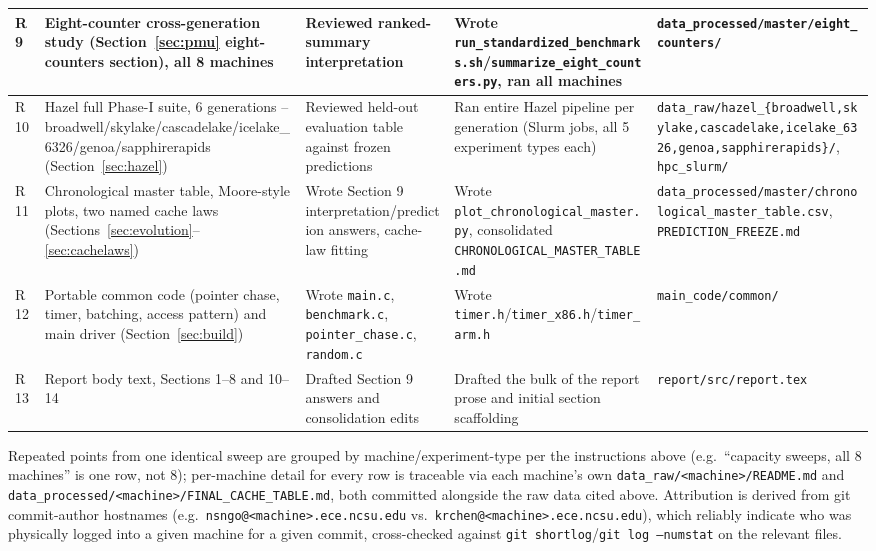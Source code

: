 \documentclass{article}
\begin{document}
\begin{longtable}{|p{1.2cm}|p{4cm}|p{2.5cm}|p{2.5cm}|p{3cm}|}
\hline
R9 & Eight-counter cross-generation study (Section~\ref{sec:pmu} eight-counters section), all 8 machines & Reviewed ranked-summary interpretation & Wrote \texttt{run\_standardized\_benchmarks.sh}/\texttt{summarize\_eight\_counters.py}, ran all machines & \texttt{data\_processed/master/eight\_counters/}\\
\hline
R10 & Hazel full Phase-I suite, 6 generations -- broadwell/skylake/cascadelake/icelake\_6326/genoa/sapphirerapids (Section~\ref{sec:hazel}) & Reviewed held-out evaluation table against frozen predictions & Ran entire Hazel pipeline per generation (Slurm jobs, all 5 experiment types each) & \texttt{data\_raw/hazel\_\{broadwell,skylake,cascadelake,icelake\_6326,genoa,sapphirerapids\}/}, \texttt{hpc\_slurm/}\\
\hline
R11 & Chronological master table, Moore-style plots, two named cache laws (Sections~\ref{sec:evolution}--\ref{sec:cachelaws}) & Wrote Section 9 interpretation/prediction answers, cache-law fitting & Wrote \texttt{plot\_chronological\_master.py}, consolidated \texttt{CHRONOLOGICAL\_MASTER\_TABLE.md} & \texttt{data\_processed/master/chronological\_master\_table.csv}, \texttt{PREDICTION\_FREEZE.md}\\
\hline
R12 & Portable common code (pointer chase, timer, batching, access pattern) and main driver (Section~\ref{sec:build}) & Wrote \texttt{main.c}, \texttt{benchmark.c}, \texttt{pointer\_chase.c}, \texttt{random.c} & Wrote \texttt{timer.h}/\texttt{timer\_x86.h}/\texttt{timer\_arm.h} & \texttt{main\_code/common/}\\
\hline
R13 & Report body text, Sections 1--8 and 10--14 & Drafted Section 9 answers and consolidation edits & Drafted the bulk of the report prose and initial section scaffolding & \texttt{report/src/report.tex}\\
\hline

\end{longtable}

Repeated points from one identical sweep are grouped by machine/experiment-type per the
instructions above (e.g.\ ``capacity sweeps, all 8 machines'' is one row, not 8); per-machine
detail for every row is traceable via each machine's own \texttt{data\_raw/<machine>/README.md}
and \texttt{data\_processed/<machine>/FINAL\_CACHE\_TABLE.md}, both committed alongside the raw
data cited above. Attribution is derived from git commit-author hostnames (e.g.\
\texttt{nsngo@<machine>.ece.ncsu.edu} vs.\ \texttt{krchen@<machine>.ece.ncsu.edu}), which
reliably indicate who was physically logged into a given machine for a given commit, cross-checked
against \texttt{git shortlog}/\texttt{git log --numstat} on the relevant files.
\end{document}
